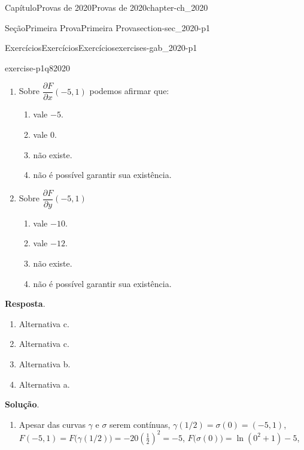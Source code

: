 \documentclass[oneside,10pt,]{book}
\newcommand{\blocktitlefont}{\relax}
\numberwithin{equation}{section}
\begin{document}
\begin{chapterptx}{Capítulo}{Provas de 2020}{}{Provas de 2020}{}{}{chapter-ch_2020}
\begin{sectionptx}{Seção}{Primeira Prova}{}{Primeira Prova}{}{}{section-sec_2020-p1}
\begin{exercises-subsection-numberless}{Exercícios}{Exercícios}{}{Exercícios}{}{}{exercises-gab_2020-p1}
\begin{divisionexercise}{8}{}{}{exercise-p1q82020}
\begin{enumerate}[label=\roman*]
\begin{enumerate}[label=\alph*]
\item{}é diferenciável em \((-5,1)\).%
\item{}não é diferenciável em \((-5,1)\).%
\item{}não temos informação suficiente para dizer algo.%
\end{enumerate}
%
\item{}Sobre \(\dfrac {\partial F}{\partial x} (-5,1)\) podemos afirmar que:%
\begin{enumerate}[label=\alph*]
\item{}vale \(-5\).%
\item{}vale \(0\).%
\item{}não existe.%
\item{}não é possível garantir sua existência.%
\end{enumerate}
%
\item{}Sobre \(\dfrac {\partial F}{\partial y} (-5,1)\)%
\begin{enumerate}[label=\alph*]
\item{}vale \(-10\).%
\item{}vale \(-12\).%
\item{}não existe.%
\item{}não é possível garantir sua existência.%
\end{enumerate}
%
\end{enumerate}
%
\par\smallskip%
\noindent\textbf{\blocktitlefont Resposta}.\hypertarget{answer-p1q82020-b}{}\quad{}%
\begin{multicols}{2}
\begin{enumerate}[label=\roman*]
\item{}Alternativa c.%
\item{}Alternativa c.%
\item{}Alternativa b.%
\item{}Alternativa a.%
\end{enumerate}
\end{multicols}
\par\smallskip%
\noindent\textbf{\blocktitlefont Solução}.\hypertarget{solution-p1q82020-c}{}\quad{}%
\begin{enumerate}[label=\roman*]
\item{}Apesar das curvas \(\gamma\) e \(\sigma\) serem contínuas, \(\gamma(1/2)=\sigma(0)=(-5,1)\), \(F(-5,1)=F\big(\gamma(1/2)\big)=-20(\frac{1}{2})^2=-5\), \(F\big(\sigma(0)\big)=\ln(0^2+1)-5\),%
\begin{align*}

\end{align*}
\end{enumerate}
\end{divisionexercise}
\end{exercises-subsection-numberless}
\end{sectionptx}
\end{chapterptx}
\end{document}
